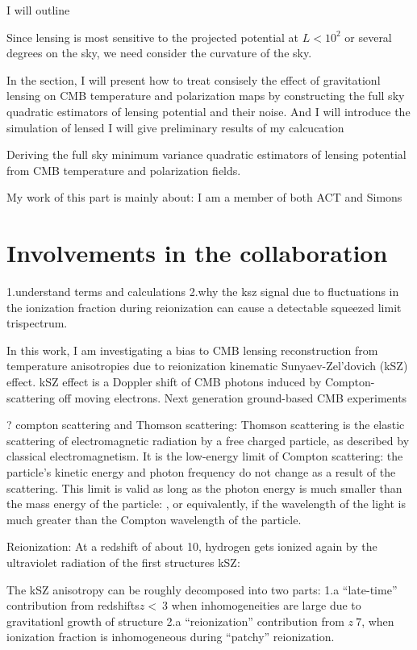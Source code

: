 \documentclass[12pt, notitlepage, onecolumn, amsmath, amssymb, aps]{revtex4-1}
\begin{document}
I will outline 

Since lensing is most sensitive to the projected potential at \(L<10^2\) or several degrees on the sky, we need consider the curvature of the sky. 


In the section, I will present how to treat consisely the effect of gravitationl lensing on CMB temperature and polarization maps by constructing the full sky quadratic estimators of lensing potential and their noise. And I will introduce the simulation of lensed I will give preliminary results of my calcucation 

Deriving the full sky minimum variance quadratic estimators of lensing potential from CMB temperature and polarization fields.

My work of this part is mainly about:
I am a member of both ACT and Simons

\section{Involvements in the collaboration}
\label{sec:org093d799}
1.understand terms and calculations\cite{Ferraro:2017fac} \cite{Alvarez:2015xzu}
2.why the ksz signal due to fluctuations in the ionization fraction during reionization can cause a detectable squeezed limit trispectrum.\cite{Smith:2016lnt}

In this work, I am investigating a bias to CMB lensing reconstruction from temperature anisotropies due to reionization kinematic Sunyaev-Zel'dovich (kSZ) effect. kSZ effect is a Doppler shift of CMB photons induced by Compton-scattering off moving electrons. Next generation ground-based CMB experiments 

? compton scattering and Thomson scattering: Thomson scattering is the elastic scattering of electromagnetic radiation by a free charged particle, as described by classical electromagnetism. It is the low-energy limit of Compton scattering: the particle's kinetic energy and photon frequency do not change as a result of the scattering. This limit is valid as long as the photon energy is much smaller than the mass energy of the particle: , or equivalently, if the wavelength of the light is much greater than the Compton wavelength of the particle.

Reionization: At a redshift of about 10, hydrogen gets ionized again by the ultraviolet radiation of the first structures
kSZ: 

The kSZ anisotropy can be roughly decomposed into two parts: 1.a ``late-time'' contribution from redshifts\(z<~3\) when inhomogeneities are large due to gravitationl growth of structure 2.a ``reionization'' contribution from \(z~7\), when ionization fraction is inhomogeneous during ``patchy'' reionization.\cite{Ferraro:2017fac}
\end{document}
